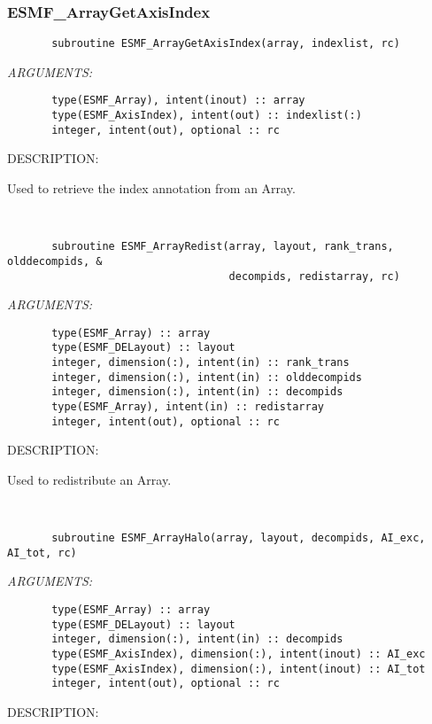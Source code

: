 \subsubsection [ESMF\_ArrayGetAxisIndex] {ESMF\_ArrayGetAxisIndex}


  
\begin{verbatim}       subroutine ESMF_ArrayGetAxisIndex(array, indexlist, rc)\end{verbatim}{\em ARGUMENTS:}
\begin{verbatim}       type(ESMF_Array), intent(inout) :: array
       type(ESMF_AxisIndex), intent(out) :: indexlist(:)
       integer, intent(out), optional :: rc\end{verbatim}
{\sf DESCRIPTION:\\ }


   Used to retrieve the index annotation from an Array.
   
 
\mbox{}\hrulefill\ 
 

\begin{verbatim}       subroutine ESMF_ArrayRedist(array, layout, rank_trans, olddecompids, &
                                   decompids, redistarray, rc)\end{verbatim}{\em ARGUMENTS:}
\begin{verbatim}       type(ESMF_Array) :: array
       type(ESMF_DELayout) :: layout
       integer, dimension(:), intent(in) :: rank_trans
       integer, dimension(:), intent(in) :: olddecompids
       integer, dimension(:), intent(in) :: decompids
       type(ESMF_Array), intent(in) :: redistarray
       integer, intent(out), optional :: rc\end{verbatim}
{\sf DESCRIPTION:\\ }


   Used to redistribute an Array.
  
   
 
\mbox{}\hrulefill\ 
 

\begin{verbatim}       subroutine ESMF_ArrayHalo(array, layout, decompids, AI_exc, AI_tot, rc)\end{verbatim}{\em ARGUMENTS:}
\begin{verbatim}       type(ESMF_Array) :: array
       type(ESMF_DELayout) :: layout
       integer, dimension(:), intent(in) :: decompids
       type(ESMF_AxisIndex), dimension(:), intent(inout) :: AI_exc
       type(ESMF_AxisIndex), dimension(:), intent(inout) :: AI_tot
       integer, intent(out), optional :: rc\end{verbatim}
{\sf DESCRIPTION:\\ }


